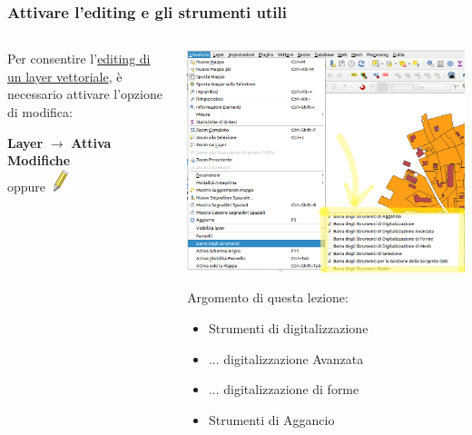 \documentclass{beamer}
\begin{document}
{\begin{frame}
   \frametitle{Attivare l'editing e gli strumenti utili}
   \begin{columns}
       \begin{column}{.5\textwidth}
            Per consentire l'\href{https://docs.qgis.org/3.22/en/docs/user_manual/working_with_vector/editing_geometry_attributes.html}{editing di un layer vettoriale}, è necessario attivare l'opzione di modifica: 
        	\begin{center}
        		 \textbf{Layer} $\rightarrow$ \textbf{Attiva Modifiche} \\
        		 oppure \includegraphics[height=.5 cm]{digitizing_pics/edit.png}
        	\end{center}
       \end{column}
       \begin{column}{.5\textwidth}
            \includegraphics[width=\textwidth] {digitizing_pics/Attivazione barre strumenti del 2022-10-11 10-53-56.png}
            {\small Argomento di questa lezione:
            \begin{itemize}
                \item Strumenti di digitalizzazione
                \item ... digitalizzazione Avanzata
                \item ... digitalizzazione di forme
                \item Strumenti di Aggancio
            \end{itemize} }
       \end{column}
   \end{columns}
	

\end{frame}}
\end{document}
